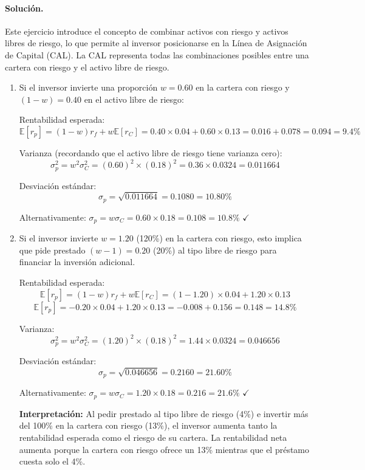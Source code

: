 \documentclass[12pt,a4paper]{article}
\newcommand{\E}{\mathbb{E}}
\newenvironment{solucion}{\paragraph{Solución.}}{}
\begin{document}
\begin{solucion}
Este ejercicio introduce el concepto de combinar activos con riesgo y activos libres de riesgo, lo que permite al inversor posicionarse en la Línea de Asignación de Capital (CAL). La CAL representa todas las combinaciones posibles entre una cartera con riesgo y el activo libre de riesgo.

\begin{enumerate}[label=\alph*)]
  \item Si el inversor invierte una proporción $w = 0.60$ en la cartera con riesgo y $(1-w) = 0.40$ en el activo libre de riesgo:
  
  Rentabilidad esperada:
  \[
  \E[r_p] = (1-w)r_f + w\E[r_C] = 0.40 \times 0.04 + 0.60 \times 0.13 = 0.016 + 0.078 = 0.094 = 9.4\%
  \]
  
  Varianza (recordando que el activo libre de riesgo tiene varianza cero):
  \[
  \sigma_p^2 = w^2 \sigma_C^2 = (0.60)^2 \times (0.18)^2 = 0.36 \times 0.0324 = 0.011664
  \]
  
  Desviación estándar:
  \[
  \sigma_p = \sqrt{0.011664} = 0.1080 = 10.80\%
  \]
  
  Alternativamente: $\sigma_p = w \sigma_C = 0.60 \times 0.18 = 0.108 = 10.8\%$ $\checkmark$

  \item Si el inversor invierte $w = 1.20$ (120\%) en la cartera con riesgo, esto implica que pide prestado $(w-1) = 0.20$ (20\%) al tipo libre de riesgo para financiar la inversión adicional.
  
  Rentabilidad esperada:
  \[
  \E[r_p] = (1-w)r_f + w\E[r_C] = (1-1.20) \times 0.04 + 1.20 \times 0.13
  \]
  \[
  \E[r_p] = -0.20 \times 0.04 + 1.20 \times 0.13 = -0.008 + 0.156 = 0.148 = 14.8\%
  \]
  
  Varianza:
  \[
  \sigma_p^2 = w^2 \sigma_C^2 = (1.20)^2 \times (0.18)^2 = 1.44 \times 0.0324 = 0.046656
  \]
  
  Desviación estándar:
  \[
  \sigma_p = \sqrt{0.046656} = 0.2160 = 21.60\%
  \]
  
  Alternativamente: $\sigma_p = w \sigma_C = 1.20 \times 0.18 = 0.216 = 21.6\%$ $\checkmark$

  \textbf{Interpretación:} Al pedir prestado al tipo libre de riesgo (4\%) e invertir más del 100\% en la cartera con riesgo (13\%), el inversor aumenta tanto la rentabilidad esperada como el riesgo de su cartera. La rentabilidad neta aumenta porque la cartera con riesgo ofrece un 13\% mientras que el préstamo cuesta solo el 4\%.


\end{enumerate}
\end{solucion}
\end{document}
